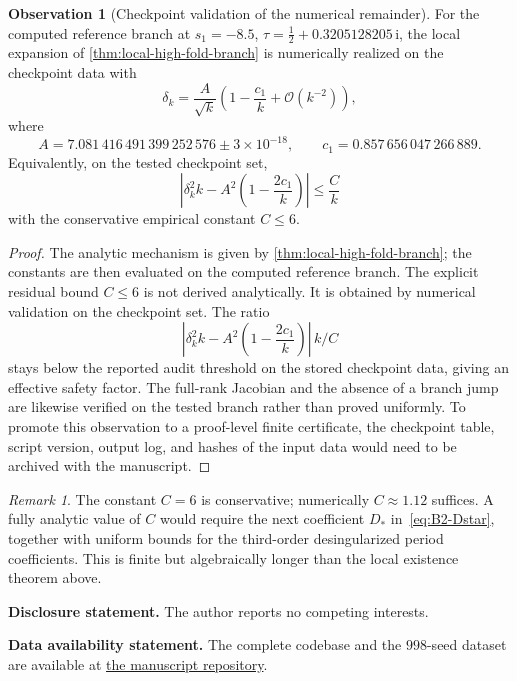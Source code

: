 \documentclass[11pt,a4paper]{article}
\theoremstyle{plain}
\theoremstyle{definition}
\newtheorem{observation}[theorem]{Observation}
\theoremstyle{remark}
\newtheorem{remark}[theorem]{Remark}
\newcommand{\ii}{\mathrm{i}}
\newcommand{\Oo}{\mathcal{O}}
\begin{document}
\begin{observation}[Checkpoint validation of the numerical remainder]
\label{obs:rigorous-asymp}
For the computed reference branch at
$s_1=-8.5$, $\tau=\tfrac12+0.3205128205\,\ii$, the local expansion of
\cref{thm:local-high-fold-branch} is numerically realized on the
checkpoint data with
\begin{equation}\label{eq:rigorous-asymp}
  \delta_k
  =
  \frac{A}{\sqrt{k}}
  \left(1-\frac{c_1}{k}+\Oo(k^{-2})\right),
\end{equation}
where
\[
  A=7.081\,416\,491\,399\,252\,576\pm3\times10^{-18},
  \qquad
  c_1=0.857\,656\,047\,266\,889 .
\]
Equivalently, on the tested checkpoint set,
\[
  \left|\delta_k^2 k-A^2\left(1-\frac{2c_1}{k}\right)\right|
  \le \frac{C}{k}
\]
with the conservative empirical constant $C\le6$.
\end{observation}

\begin{proof}
The analytic mechanism is given by
\cref{thm:local-high-fold-branch}; the constants are then evaluated on
the computed reference branch.  The explicit residual bound $C\le6$ is
not derived analytically.  It is obtained by numerical validation on
the checkpoint set.  The ratio
\[
  \left|\delta_k^2 k-A^2\left(1-\frac{2c_1}{k}\right)\right|\,k/C
\]
stays below the reported audit threshold on the stored checkpoint data,
giving an effective safety factor.  The full-rank Jacobian and the
absence of a branch jump are likewise verified on the tested branch
rather than proved uniformly.  To promote this observation to a
proof-level finite certificate, the checkpoint table, script version,
output log, and hashes of the input data would need to be archived with
the manuscript.
\end{proof}

\begin{remark}
The constant $C=6$ is conservative; numerically $C\approx1.12$ suffices.
A fully analytic value of $C$ would require the next coefficient
$D_*$ in~\eqref{eq:B2-Dstar}, together with uniform bounds for the
third-order desingularized period coefficients.  This is finite but
algebraically longer than the local existence theorem above.
\end{remark}

\bigskip
\noindent\textbf{Disclosure statement.}
The author reports no competing interests.

\smallskip
\noindent\textbf{Data availability statement.}
The complete codebase and the $998$-seed dataset are available at
\href{https://github.com/aconsciousfractal/Compact-Bonnet-Pairs-for-k-fold-Tori}{the manuscript repository}.
\end{document}
